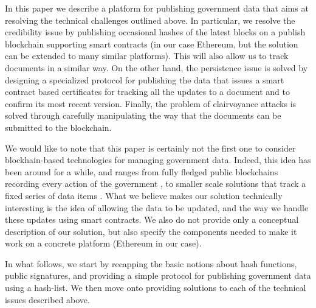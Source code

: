 In this paper we describe a platform for publishing government data that aims at resolving the technical challenges outlined above. In particular, 
we resolve the credibility issue by publishing occasional hashes of the latest blocks on a publish blockchain supporting smart contracts (in our case Ethereum, but the solution can be extended to many similar platforms). This will also allow us to track documents in a similar way. On the other hand, the persistence issue is solved by designing a specialized protocol for publishing the data that issues a smart contract based certificates for tracking all the updates to a document and to confirm its most recent version. Finally, the problem of clairvoyance attacks is solved through carefully manipulating the way that the documents can be submitted to the blockchain.

We would like to note that this paper is certainly not the first one to consider blockhain-based technologies for managing government data. Indeed, this idea has been around for a while, and ranges from fully fledged public blockchains recording every action of the government \cite{eushit,ibmshit}, to smaller scale solutions that track a fixed series of data items \cite{energiaabierta}. What we believe makes our solution technically interesting is the idea of allowing the data to be updated, and the way we handle these updates using smart contracts. We also do not provide only a conceptual description of our solution, but also specify the components needed to make it work on a concrete platform (Ethereum in our case).

In what follows, we start by recapping the basic notions about hash functions, public signatures, and providing a simple protocol for publishing government data using a hash-list. We then move onto providing solutions to each of the technical issues described above.